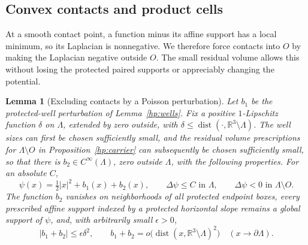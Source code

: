 \documentclass[11pt]{article}
\numberwithin{equation}{section}
\newtheorem{lemma}[theorem]{Lemma}
\theoremstyle{definition}
\theoremstyle{remark}
\newcommand{\R}{\mathbb R}
\DeclareMathOperator{\dist}{dist}
\begin{document}
\subsection{Convex contacts and product cells}

At a smooth contact point, a function minus its affine support has a
local minimum, so its Laplacian is nonnegative.  We therefore force
contacts into $O$ by making the Laplacian negative outside $O$.  The
small residual volume allows this without losing the protected paired
supports or appreciably changing the potential.

\begin{lemma}[Excluding contacts by a Poisson perturbation]\label{qt:poisson}
Let $b_1$ be the protected-well perturbation of Lemma~\ref{hp:wells}.
Fix a positive $1$-Lipschitz function $\delta$ on $\Lambda$, extended by
zero outside, with $\delta\leq\dist(\cdot,\R^3\setminus\Lambda)$.
The well sizes can first be chosen sufficiently small, and the residual
volume prescriptions for $\Lambda\setminus O$ in
Proposition~\ref{hp:carrier} can subsequently be chosen sufficiently small,
so that there is $b_2\in C^\infty(\Lambda)$, zero outside $\Lambda$,
with the following properties.  For an absolute $C$,
\begin{equation}\label{qt:laplacian}
 \psi(x)=\tfrac12|x|^2+b_1(x)+b_2(x),\qquad
 \Delta\psi\leq C\text{ in }\Lambda,\qquad
 \Delta\psi<0\text{ in }\Lambda\setminus O.
\end{equation}
The function $b_2$ vanishes on neighborhoods of all protected endpoint
boxes, every prescribed affine support indexed by a protected
horizontal slope remains a global support of $\psi$, and, with
arbitrarily small $\epsilon>0$,
\begin{equation}\label{qt:potential-smallness}
 |b_1+b_2|\leq\epsilon\delta^2,\qquad
 b_1+b_2=o\bigl(\dist(x,\R^3\setminus\Lambda)^2\bigr)
 \quad(x\to\partial\Lambda).
\end{equation}
\end{lemma}
\end{document}
